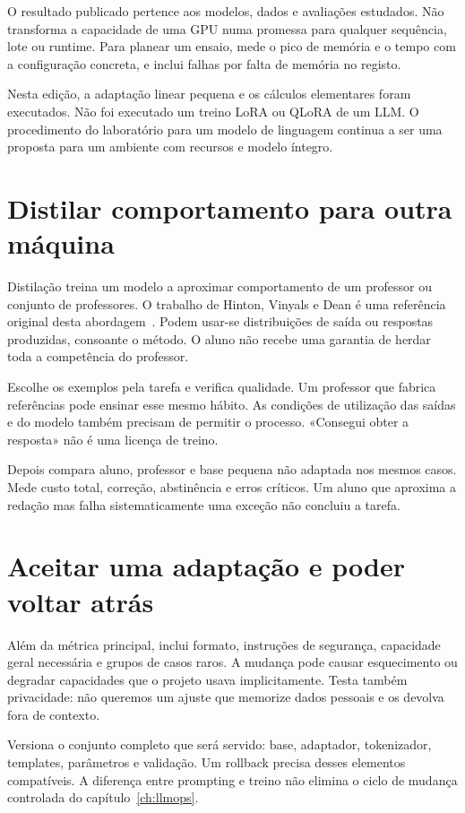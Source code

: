 O resultado publicado pertence aos modelos, dados e avaliações estudados. Não transforma a capacidade de uma GPU numa promessa para qualquer sequência, lote ou runtime. Para planear um ensaio, mede o pico de memória e o tempo com a configuração concreta, e inclui falhas por falta de memória no registo.

Nesta edição, a adaptação linear pequena e os cálculos elementares foram executados. Não foi executado um treino LoRA ou QLoRA de um LLM. O procedimento do laboratório para um modelo de linguagem continua a ser uma proposta para um ambiente com recursos e modelo íntegro.

\section{Distilar comportamento para outra máquina}
Distilação treina um modelo a aproximar comportamento de um professor ou conjunto de professores. O trabalho de Hinton, Vinyals e Dean é uma referência original desta abordagem~\citep{hinton2015}. Podem usar-se distribuições de saída ou respostas produzidas, consoante o método. O aluno não recebe uma garantia de herdar toda a competência do professor.

Escolhe os exemplos pela tarefa e verifica qualidade. Um professor que fabrica referências pode ensinar esse mesmo hábito. As condições de utilização das saídas e do modelo também precisam de permitir o processo. «Consegui obter a resposta» não é uma licença de treino.

Depois compara aluno, professor e base pequena não adaptada nos mesmos casos. Mede custo total, correção, abstinência e erros críticos. Um aluno que aproxima a redação mas falha sistematicamente uma exceção não concluiu a tarefa.

\section{Aceitar uma adaptação e poder voltar atrás}
Além da métrica principal, inclui formato, instruções de segurança, capacidade geral necessária e grupos de casos raros. A mudança pode causar esquecimento ou degradar capacidades que o projeto usava implicitamente. Testa também privacidade: não queremos um ajuste que memorize dados pessoais e os devolva fora de contexto.

Versiona o conjunto completo que será servido: base, adaptador, tokenizador, templates, parâmetros e validação. Um rollback precisa desses elementos compatíveis. A diferença entre prompting e treino não elimina o ciclo de mudança controlada do capítulo~\ref{ch:llmops}.

